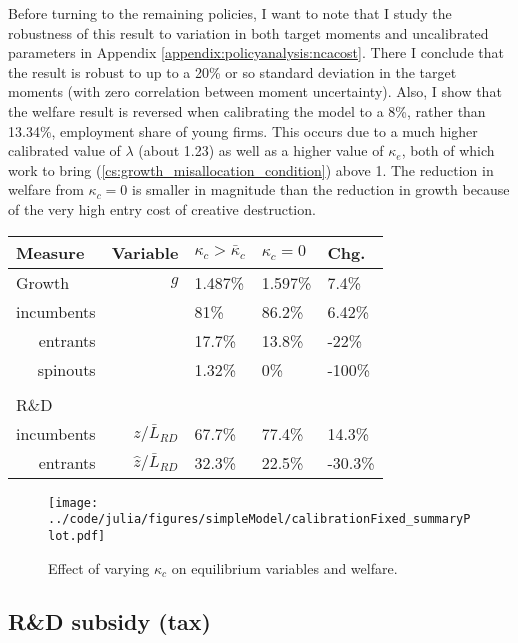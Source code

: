 \documentclass[11pt,english]{article}
\begin{document}
Before turning to the remaining policies, I want to note that I study the robustness of this result to variation in both target moments and uncalibrated parameters in Appendix \ref{appendix:policyanalysis:ncacost}. There I conclude that the result is robust to up to a 20\% or so standard deviation in the target moments (with zero correlation between moment uncertainty). Also, I show that the welfare result is reversed when calibrating the model to a 8\%, rather than 13.34\%, employment share of young firms. This occurs due to a much higher calibrated value of $\lambda$ (about 1.23) as well as a higher value of $\kappa_e$, both of which work to bring (\ref{cs:growth_misallocation_condition}) above 1. The reduction in welfare from $\kappa_c = 0$ is smaller in magnitude than the reduction in growth because of the very high entry cost of creative destruction.





\begin{table}
	\centering
	\label{reducing_kappa_c_decomposition_table}
	\begin{tabular}{lrlll}
		\toprule \toprule
		Measure & Variable & $\kappa_c > \bar{\kappa}_c$ & $\kappa_c = 0$ & Chg. \tabularnewline
		\midrule
		Growth & $g$ & 1.487\% & 1.597\% & 7.4\% \tabularnewline
		\multicolumn{1}{r}{incumbents} &  & 81\% & 86.2\% & 6.42\% \tabularnewline
		\multicolumn{1}{r}{entrants} &  & 17.7\% & 13.8\% & -22\% \tabularnewline
		\multicolumn{1}{r}{spinouts} &  & 1.32\% & 0\% & -100\% \tabularnewline
		\tabularnewline
		R\&D & & & & 
		\tabularnewline
		\multicolumn{1}{r}{incumbents}  & $z / \bar{L}_{RD}$ & 67.7\% & 77.4\% & 14.3\% \tabularnewline 
		
		\multicolumn{1}{r}{entrants}  & $\hat{z} / \bar{L}_{RD}$ & 32.3\% & 22.5\% & -30.3\% \tabularnewline
		\bottomrule
	\end{tabular}
\end{table}



\begin{figure}[]
	\texttt{[image: ../code/julia/figures/simpleModel/calibrationFixed\_summaryPlot.pdf]}
	\caption{Effect of varying $\kappa_c$ on equilibrium variables and welfare.}
	\label{calibration_summaryPlot}
\end{figure}

\subsection{R\&D subsidy (tax)}
\end{document}
